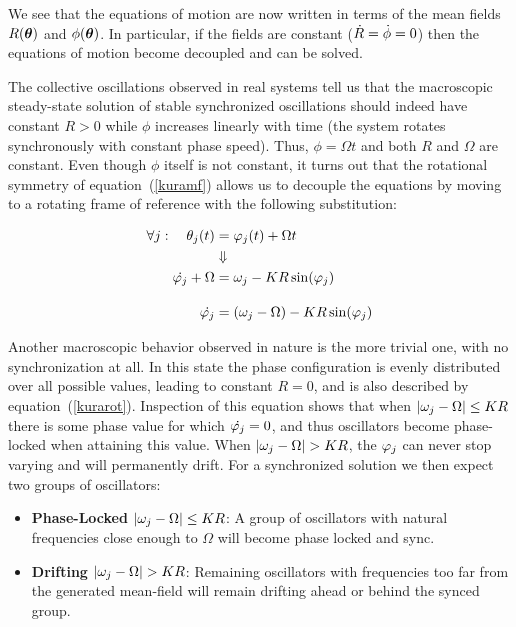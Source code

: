 We see that the equations of motion are now written in terms of the mean fields $R(\bm{\theta})$ and $\phi(\bm{\theta})$. In
particular, if the fields are constant ($\dot{R} = \dot{\phi}=0$) then the equations of motion become decoupled and can be solved.

The collective oscillations observed in real systems tell us that the macroscopic steady-state solution of stable synchronized
oscillations should indeed have constant $R>0$ while $\phi$ increases linearly with time (the system rotates synchronously with
constant phase speed).  Thus, $\phi=\Omega t$ and both $R$ and $\Omega$ are constant. Even though $\phi$ itself is not constant, it
turns out that the rotational symmetry of equation~(\ref{kuramf}) allows us to decouple the equations by moving to a rotating frame of
reference with the following substitution:

\begin{align}
    \forall j: \quad \theta_j(t) &= \varphi_j(t) + \Omega t \notag\\
    &\Downarrow \notag\\
    \dot{\varphi_j} + \Omega &= \omega_j - K R \sin ( \varphi_j ) \notag\\[10pt]
    \dot{\varphi_j} &= (\omega_j-\Omega) - K R \sin ( \varphi_j )
    \label{kurarot}
\end{align}

Another macroscopic behavior observed in nature is the more trivial one, with no synchronization at all. In this state the phase
configuration is evenly distributed over all possible values, leading to constant $R=0$, and is also described by
equation~(\ref{kurarot}). Inspection of this equation shows that when $|\omega_j - \Omega| \leq K R$ there is some phase value for
which $\dot{\varphi_j}=0$, and thus oscillators become phase-locked when attaining this value. When $|\omega_j - \Omega| > K R$,
the $\varphi_j$ can never stop varying and will permanently drift. For a synchronized solution we then expect two groups of
oscillators:

\begin{itemize}
    \item \textbf{Phase-Locked} $|\omega_j - \Omega|\leq K R$: A group of oscillators with natural frequencies close enough to
        $\Omega$ will become phase locked and sync.
    \item \textbf{Drifting} $|\omega_j - \Omega| > K R$: Remaining oscillators with frequencies too far from the generated mean-field
        will remain drifting ahead or behind the synced group.
\end{itemize}

